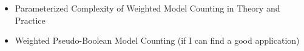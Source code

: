 \documentclass{article}
\begin{document}
\begin{itemize}
\item Parameterized Complexity of Weighted Model Counting in Theory and
  Practice 
\item Weighted Pseudo-Boolean Model Counting (if I can find a good application)
\end{itemize}







\end{document}
